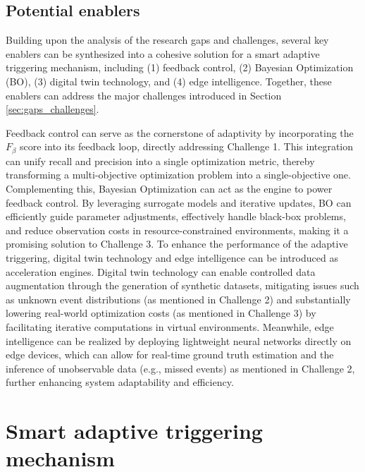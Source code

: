 \documentclass[a4paper,fleqn,numbers,sort&compress]{cas-sc}
\begin{document}
\subsection{Potential enablers}

Building upon the analysis of the research gaps and challenges, several key enablers can be synthesized into a cohesive solution for a smart adaptive triggering mechanism, including (1) feedback control, (2) Bayesian Optimization (BO), (3) digital twin technology, and (4) edge intelligence. Together, these enablers can address the major challenges introduced in Section \ref{sec:gaps_challenges}.

Feedback control \citep{ogata_modern_2010} can serve as the cornerstone of adaptivity by incorporating the \(F_{\beta}\) score into its feedback loop, directly addressing Challenge 1. This integration can unify recall and precision into a single optimization metric, thereby transforming a multi-objective optimization problem into a single-objective one. Complementing this, Bayesian Optimization \citep{agrawal_bayesianoptimization_2021} can act as the engine to power feedback control. By leveraging surrogate models and iterative updates, BO can efficiently guide parameter adjustments, effectively handle black-box problems, and reduce observation costs in resource-constrained environments, making it a promising solution to Challenge 3. To enhance the performance of the adaptive triggering, digital twin technology \citep{ganguli_digitaltwindynamic_2023} and edge intelligence \citep{lea_iot_2020} can be introduced as acceleration engines. Digital twin technology can enable controlled data augmentation through the generation of synthetic datasets, mitigating issues such as unknown event distributions (as mentioned in Challenge 2) and substantially lowering real-world optimization costs (as mentioned in Challenge 3) by facilitating iterative computations in virtual environments. Meanwhile, edge intelligence can be realized by deploying lightweight neural networks directly on edge devices, which can allow for real-time ground truth estimation and the inference of unobservable data (e.g., missed events) as mentioned in Challenge 2, further enhancing system adaptability and efficiency.

\section{Smart adaptive triggering mechanism}
\label{sec:smart_adaptive_triggering_mechanism}
\end{document}

